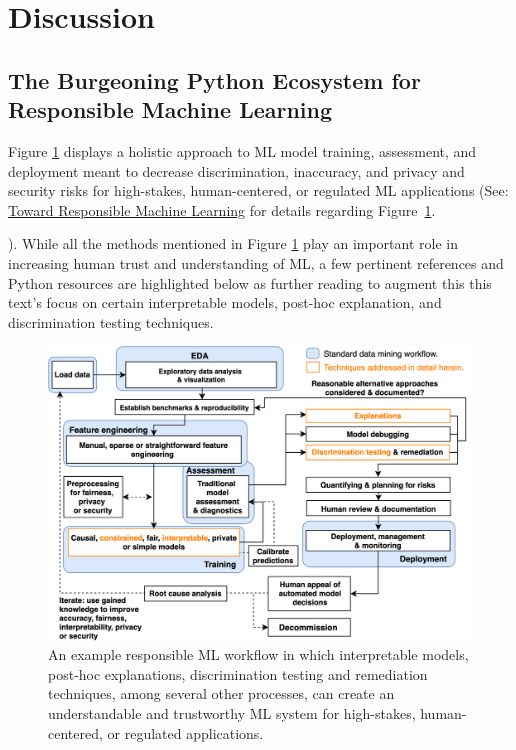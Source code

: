 \documentclass[information,article,accept,moreauthors,pdftex]{Definitions/mdpi}
\begin{document}
{{{%
\section{Discussion}\label{sec:disc}
\vspace{-6pt}

\subsection{The Burgeoning Python Ecosystem for Responsible Machine Learning}

Figure \ref{fig:blueprint} displays a holistic approach to ML model training, assessment, and deployment meant to decrease discrimination, inaccuracy, and privacy and security risks for high-stakes, human-centered, or regulated ML applications (See: \href{https://github.com/jphall663/hc_ml}{Toward Responsible Machine Learning} for details regarding Figure~\ref{fig:blueprint}.}). While all the methods mentioned in Figure \ref{fig:blueprint} play an important role in increasing human trust and understanding of ML, a few pertinent references and Python resources are highlighted below as further reading to augment this this text's focus on certain interpretable models, post-hoc explanation, and discrimination testing techniques.   

\begin{figure}[H]
	\centering
	\includegraphics[width=15cm]{img/blueprint.png}
	\caption{An example responsible ML workflow in which interpretable models, post-hoc explanations, discrimination testing and remediation techniques, among several other processes, can create an understandable and trustworthy ML system for high-stakes, human-centered, or regulated applications.}
	\label{fig:blueprint}
\end{figure} 

}}
\end{document}
